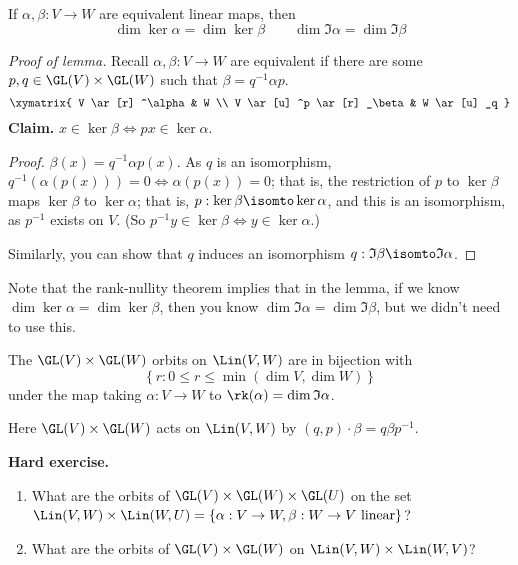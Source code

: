 \begin{lemma}
	If $\alpha,\beta:V\to W$ are equivalent linear maps, then %
	\begin{equation*}
		\dim\ker\alpha = \dim\ker\beta
		\qquad
		\dim\Im\alpha = \dim\Im\beta
	\end{equation*}
\end{lemma}

\begin{proof}
	[Proof of lemma] Recall $\alpha,\beta:V\to W$ are equivalent if there are some $p,q\in\GL(V)\times \GL(W)$ such that $\beta=q^{-1}\alpha p$. %
	\begin{equation*}
		\xymatrix{
			V
				\ar [r] ^\alpha
			&
			W \\
			V
				\ar [u] ^p
				\ar [r] _\beta
			&
			W
				\ar [u] _q
		}
	\end{equation*}
	\textbf{Claim.} $x\in\ker\beta \iff px\in\ker\alpha$.
	
	\emph{Proof.} $\beta(x)=q^{-1}\alpha p(x)$. As $q$ is an isomorphism, $q^{-1}(\alpha(p(x))) = 0 \iff \alpha(p(x)) = 0$; that is, the restriction of $p$ to $\ker\beta$ maps $\ker\beta$ to $\ker\alpha$; that is, $p:\ker\beta\isomto\ker\alpha$, and this is an isomorphism, as $p^{-1}$ exists on $V$. (So $p^{-1} y \in \ker\beta \iff y\in\ker\alpha$.) %
	
	Similarly, you can show that $q$ induces an isomorphism $q:\Im\beta \isomto \Im\alpha$. %
\end{proof}

Note that the rank-nullity theorem implies that in the lemma, if we know $\dim\ker\alpha = \dim\ker\beta$, then you know $\dim\Im\alpha = \dim\Im\beta$, but we didn't need to use this.

\begin{theorem}
	 The $\GL(V)\times\GL(W)$ orbits on $\Lin(V,W)$ are in bijection with %
	\begin{equation*}
		\left\{r:0\leq r\leq \min(\dim V,\dim W)\right\}
	\end{equation*}
	under the map taking $\alpha:V \to W$ to $\rk(\alpha) = \dim\Im\alpha$. %
	
	Here $\GL(V) \times \GL(W)$ acts on $\Lin(V,W)$ by $(q,p)\cdot\beta = q\beta p^{-1}$. %
\end{theorem}

\textbf{Hard exercise.}

\begin{enumerate}
	\shortskip
	\item What are the orbits of $\GL(V) \times \GL(W) \times \GL(U)$ on the set $\Lin(V,W) \times \Lin(W,U) = \left\{\alpha:V\to W,\beta:W\to V \text{ linear}\right\}$? %
	
	\item What are the orbits of $\GL(V) \times \GL(W)$ on $\Lin(V,W) \times \Lin(W,V)$? %
\end{enumerate}

